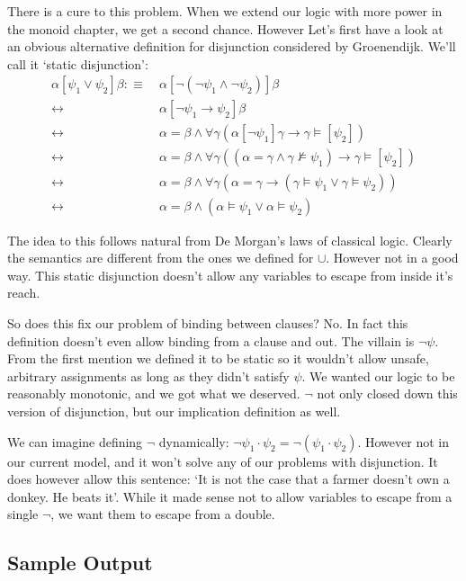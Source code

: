 \documentclass[12pt]{article}
\begin{document}
There is a cure to this problem. When we extend our logic with more power in the monoid chapter, we get a second chance. However Let's first have a look at an obvious alternative definition for disjunction considered by Groenendijk\cite{groenendijk1991dynamic}. We'll call it `static disjunction':
\begin{align}
\alpha[\psi_1\vee\psi_2]\beta
 :\equiv&\ \alpha[\neg(\neg\psi_1\wedge\neg\psi_2)]\beta \nonumber\\
 \leftrightarrow&\ \alpha[\neg\psi_1\rightarrow\psi_2]\beta \nonumber\\
 \leftrightarrow&\ \alpha = \beta \wedge \forall\gamma(\alpha[\neg\psi_1]\gamma\rightarrow\gamma\models[\psi_2]) \nonumber\\
 \leftrightarrow&\ \alpha = \beta \wedge \forall\gamma((\alpha=\gamma\wedge\gamma\not\models\psi_1)\rightarrow\gamma\models[\psi_2]) \nonumber\\
 \leftrightarrow&\ \alpha = \beta \wedge \forall\gamma(\alpha=\gamma\rightarrow(\gamma\models\psi_1\vee\gamma\models\psi_2)) \nonumber\\
 \leftrightarrow&\ \alpha = \beta \wedge (\alpha\models\psi_1\vee\alpha\models\psi_2) \label{sem_or}
\end{align}

The idea to this follows natural from De Morgan's laws of classical logic. Clearly the semantics are different from the ones we defined for $\cup$. However not in a good way. This static disjunction doesn't allow any variables to escape from inside it's reach.

So does this fix our problem of binding between clauses? No. In fact this definition doesn't even allow binding from a clause and out. The villain is $\neg\psi$. From the first mention we defined it to be static so it wouldn't allow unsafe, arbitrary assignments as long as they didn't satisfy $\psi$. We wanted our logic to be reasonably monotonic, and we got what we deserved. $\neg$ not only closed down this version of disjunction, but our implication definition as well.

We can imagine defining $\neg$ dynamically: $\neg\psi_1\cdot\psi_2 = \neg(\psi_1\cdot\psi_2)$. However not in our current model, and it won't solve any of our problems with disjunction. It does however allow this sentence: `It is not the case that a farmer doesn't own a donkey. He beats it'. While it made sense not to allow variables to escape from a single $\neg$, we want them to escape from a double.

\subsection{Sample Output}
\end{document}
